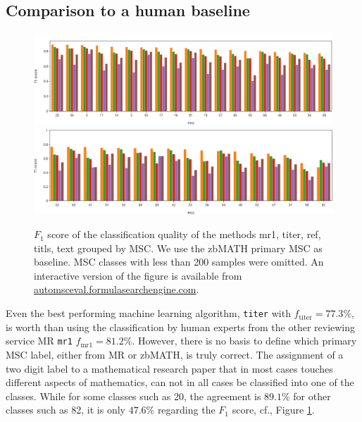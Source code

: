 \subsection{Comparison to a human baseline}
\begin{figure}[ht]
  \centering
  \includegraphics[width=1.1\textwidth]{overview1.png}
  \includegraphics[width=1.1\textwidth]{overview2.png}
  \caption{$F_1$ score of the classification quality of the methods mr1, titer, ref, titls, text grouped by MSC. We use the zbMATH primary MSC as baseline. MSC classes with less than 200 samples were omitted. An interactive version of the figure is available from \url{automsceval.formulasearchengine.com}.}\label{fgHum}
\end{figure}
Even the best performing machine learning algorithm, \texttt{titer} with $f_\mathrm{titer}=77.3\%$, is worth than using the classification by human experts from the other reviewing service MR \texttt{mr1} $f_\mathrm{mr1}=81.2\%.$ 
However, there is no basis to define which primary MSC label, either from MR or zbMATH, is truly correct.
The assignment of a two digit label to a mathematical research paper that in most cases touches different aspects of mathematics, can not in all cases be classified into one of the classes.
While for some classes such as 20, the agreement is $89.1\%$ for other classes such as 82, it is only $47.6\%$ regarding the $F_1$ score, cf., Figure \ref{fgHum}.

